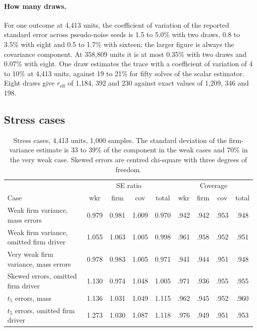 \documentclass[11pt]{article}
\newcommand{\reff}{r_{\mathrm{eff}}}
\begin{document}
\paragraph{How many draws.} For one outcome at 4,413 units, the coefficient
of variation of the reported standard error across pseudo-noise seeds is 1.5
to 5.0\% with two draws, 0.8 to 3.5\% with eight and 0.5 to 1.7\% with
sixteen; the larger figure is always the covariance component. At 358,809
units it is at most 0.35\% with two draws and 0.07\% with eight. One draw
estimates the trace with a coefficient of variation of 4 to 10\% at 4,413
units, against 19 to 21\% for fifty solves of the scalar estimator. Eight
draws give $\reff$ of 1,184, 392 and 230 against exact values of 1,209, 346
and 198.

\subsection{Stress cases}

\begin{table}[ht]
\centering\small
\begin{tabular}{@{}lcccc@{\hskip 1.2em}cccc@{}}
\toprule
 & \multicolumn{4}{c}{SE ratio} & \multicolumn{4}{c}{Coverage} \\
Case & wkr & firm & cov & total & wkr & firm & cov & total \\
\midrule
Weak firm variance, mass errors & 0.979 & 0.981 & 1.009 & 0.970 & .942 & .942 & .953 & .948 \\
Weak firm variance, omitted firm driver & 1.055 & 1.063 & 1.005 & 0.998 & .961 & .958 & .952 & .951 \\
Very weak firm variance, mass errors & 0.978 & 0.983 & 1.005 & 0.971 & .941 & .944 & .951 & .948 \\
Skewed errors, omitted firm driver & 1.130 & 0.974 & 1.048 & 1.005 & .971 & .936 & .955 & .955 \\
$t_5$ errors, mass & 1.136 & 1.031 & 1.049 & 1.115 & .962 & .945 & .952 & .960 \\
$t_5$ errors, omitted firm driver & 1.273 & 1.030 & 1.087 & 1.118 & .976 & .949 & .951 & .953 \\
\bottomrule
\end{tabular}
\caption{Stress cases, 4,413 units, 1,000 samples. The standard deviation of
the firm-variance estimate is 33 to 39\% of the component in the weak cases
and 70\% in the very weak case. Skewed errors are centred chi-square with
three degrees of freedom.}\label{tab:stress}
\end{table}
\end{document}
